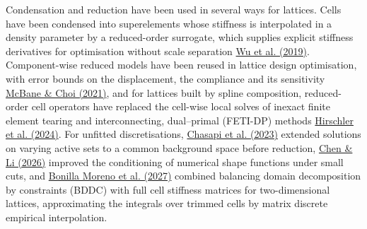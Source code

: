 \documentclass[preprint,12pt,authoryear]{elsarticle}
\begin{document}
Condensation and reduction have been used in several ways for lattices. Cells have been condensed into superelements whose stiffness is interpolated in a density parameter by a reduced-order surrogate, which supplies explicit stiffness derivatives for optimisation without scale separation \href{https://doi.org/10.1016/j.cma.2018.11.003}{Wu et al. (2019)}. Component-wise reduced models have been reused in lattice design optimisation, with error bounds on the displacement, the compliance and its sensitivity \href{https://doi.org/10.1016/j.cma.2021.113813}{McBane \& Choi (2021)}, and for lattices built by spline composition, reduced-order cell operators have replaced the cell-wise local solves of inexact finite element tearing and interconnecting, dual--primal (FETI-DP) methods \href{https://doi.org/10.1002/nme.7419}{Hirschler et al. (2024)}. For unfitted discretisations, \href{https://doi.org/10.1016/j.cma.2023.115997}{Chasapi et al. (2023)} extended solutions on varying active sets to a common background space before reduction, \href{https://doi.org/10.1016/j.cad.2026.104038}{Chen \& Li (2026)} improved the conditioning of numerical shape functions under small cuts, and \href{https://doi.org/10.1016/j.cma.2026.119304}{Bonilla Moreno et al. (2027)} combined balancing domain decomposition by constraints (BDDC) with full cell stiffness matrices for two-dimensional lattices, approximating the integrals over trimmed cells by matrix discrete empirical interpolation.
\end{document}
